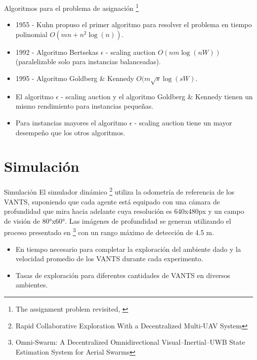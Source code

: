 \documentclass[
  24pt, %
  aspectratio=169, %
]{beamer}
\begin{document}
\begin{frame}{Algoritmos para el problema de asignación \footnote{The assignment problem revisited, \cite{Alfaro2021}}}

  \begin{itemize}
  \item 1955 - Kuhn propuso el primer algoritmo para resolver el problema en tiempo polinomial \textbf{$O(mn+n^{2}\log(n))$}.
  \item 1992 - Algoritmo Bertsekas $\epsilon$ - scaling auction \textbf{$O(nm\log(nW))$} (paralelizable solo para instancias balanceadas).
  \item 1995 - Algoritmo Goldberg \& Kennedy \textbf{$O(m\sqrt{s}\log(sW)$}. 
  \item El algoritmo $\epsilon$ - scaling auction y el algoritmo Goldberg \& Kennedy tienen un mismo rendimiento para instancias pequeñas. 
  \item Para instancias mayores el algoritmo $\epsilon$ - scaling auction tiene un mayor desempeño que los otros algoritmos.
  \end{itemize}
\end{frame}


\section{Simulación}
\begin{frame}{Simulación}
  El simulador dinámico \cite{RACER2022} \footnote{Rapid Collaborative Exploration With a Decentralized Multi-UAV System} utiliza la odometría de referencia de los VANTS, suponiendo que cada agente está equipado con una cámara de profundidad que mira hacia adelante cuya resolución es 640x480px y un campo de visión de 80°x60°. Las imágenes de profundidad se generan utilizando el proceso presentado en \cite{OMNI2022} \footnote{Omni-Swarm: A Decentralized Omnidirectional Visual–Inertial–UWB State Estimation System for Aerial Swarms} con un rango máximo de detección de 4.5 m.
  \bigskip %
  \begin{itemize}
  \item En tiempo necesario para completar la exploración del ambiente dado y la velocidad promedio de los VANTS durante cada experimento.
  \item Tasas de exploración para diferentes cantidades de VANTS en diversos ambientes.
  \end{itemize}
\end{frame}
\end{document}

